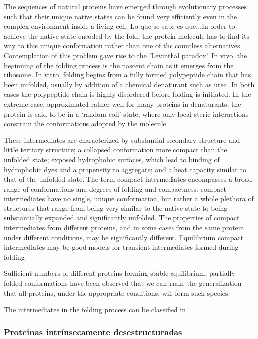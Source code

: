 The sequences of natural proteins have emerged through evolutionary processes such that their unique native states can be found very efficiently even in the complex environment inside a living cell.
Lo que se sabe es que...In order to achieve the native state encoded by the fold, the protein molecule has to find its way to this unique conformation rather than one of the countless alternatives. 
Contemplation of this problem gave rise to the 'Levinthal paradox'. 
In vivo, the beginning of the folding process is the nascent chain as it emerges from the ribosome. 
In vitro, folding begins from a fully formed polypeptide chain that has been unfolded, usually by addition of a chemical denaturant such as urea. 
In both cases the polypeptide chain is highly disordered before folding is initiated. 
In the extreme case, approximated rather well for many proteins in denaturants, the protein is said to be in a `random coil' state, where only local steric interactions constrain the conformations adopted by the molecule.



These intermediates are characterized by substantial secondary structure and little tertiary
structure; a collapsed conformation more compact than the unfolded state; exposed hydrophobic surfaces, 
which lead to binding of hydrophobic dyes
and a propensity to aggregate; 
and a heat capacity similar
to that of the unfolded state. 
The term compact intermediates
encompasses a broad range of conformations
and degrees of
folding and compactness.
compact intermediates have no single, unique conformation, but rather a whole plethora of structures that range from being very
similar to the native state to being substantially expanded and significantly unfolded. 
The properties of compact intermediates from different proteins, and in some cases from the same protein under different conditions, may be significantly different. 
Equilibrium compact intermediates may be good models for transient intermediates formed during folding

Sufficient numbers of different proteins forming stable-equilibrium, partially folded conformations have been observed that we can
make the generalization that all proteins, under the appropriate conditions, will form such species.


The intermediates in the folding process can be classified in





\subsubsection{Proteinas intrínsecamente desestructuradas}

